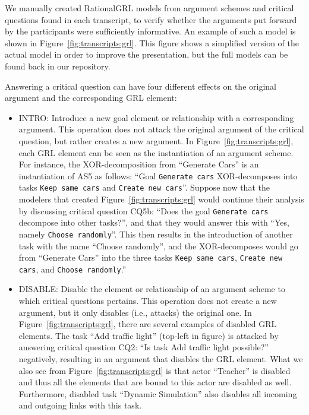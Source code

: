 We manually created RationalGRL models from argument schemes and critical questions found in each transcript, to verify whether the arguments put forward by the participants were sufficiently informative. An example of such a model is shown in Figure~\ref{fig:transcripts:grl}. This figure shows a simplified version of the actual model in order to improve the presentation, but the full models can be found back in our repository.  

Answering a critical question can have four different effects on the original argument and the corresponding GRL element:
\begin{itemize} 
\item \textsf{INTRO}: Introduce a new goal element or relationship with a corresponding argument. This operation does not attack the original argument of the critical question, but rather creates a new argument. In Figure~\ref{fig:transcripts:grl}, each GRL element can be seen as the instantiation of an argument scheme. For instance, the XOR-decomposition from ``Generate Cars'' is an instantiation of AS5 as follows: ``Goal \texttt{Generate cars} XOR-decomposes into tasks \texttt{Keep same cars} and \texttt{Create new cars}''. Suppose now that the modelers that created Figure~\ref{fig:transcripts:grl} would continue their analysis by discussing critical question CQ5b: ``Does the goal \texttt{Generate cars} decompose into other tasks?'', and that they would answer this with ``Yes, namely \texttt{Choose randomly}''. This then results in the introduction of another task with the name ``Choose randomly'', and the XOR-decomposes would go from ``Generate Cars'' into the three tasks \texttt{Keep same cars}, \texttt{Create new cars}, and \texttt{Choose randomly}.'' %
\item \textsf{DISABLE:} Disable the element or relationship of an argument scheme to which critical questions pertains. This operation does not create a new argument, but it only disables (i.e., attacks) the original one. In Figure~\ref{fig:transcripts:grl}, there are several examples of disabled GRL elements. The task ``Add traffic light'' (top-left in figure) is attacked by answering critical question CQ2: ``Is task Add traffic light possible?'' negatively, resulting in an argument that disables the GRL element. What we also see from Figure~\ref{fig:transcripts:grl} is that actor ``Teacher'' is disabled and thus all the elements that are bound to this actor are disabled as well. Furthermore, disabled task ``Dynamic Simulation'' also disables all incoming and outgoing links with this task.


\end{itemize}
